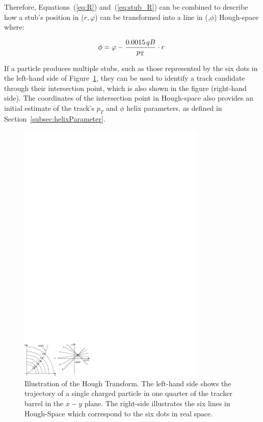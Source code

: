 Therefore, Equations~(\ref{eq:R}) and~(\ref{eq:stub_R}) can be combined to describe how a stub's position in ($r, \varphi$) can be transformed into a line in (\qpt,$\phi$) Hough-space where:

\begin{equation}
\phi = \varphi - \frac{0.0015\,qB}{p_{\mathrm{T}}}\cdot r \;
\label{eq:localHT}
\end{equation}

If a particle produces multiple stubs, such as those represented by the six dots in the left-hand side of Figure~\ref{fig:HT}, they can be used to identify a track candidate through their intersection point, which is also shown in the figure (right-hand side).
The coordinates of the intersection point in Hough-space also provides an initial estimate of the track's $p_{T}$ and $\phi$ helix parameters, as defined in Section~\ref{subsec:helixParameter}.

\begin{figure}[!h]
\centering
\includegraphics[width=0.80\textwidth]{figs/tk-upgrade/HT.pdf}
\caption{Illustration of the Hough Transform. The left-hand side shows the trajectory of a single charged particle in one quarter of the tracker barrel in the $x-y$ plane. The right-side illustrates the six lines in Hough-Space which correspond to the six dots in real space.}
\label{fig:HT}
\end{figure}


